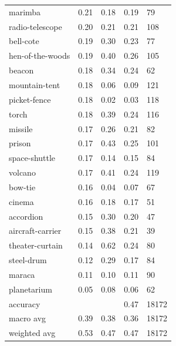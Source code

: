 \begin{center}
\begin{longtable}{lllll}
marimba & 0.21 & 0.18 & 0.19 & 79 \\
radio-telescope & 0.20 & 0.21 & 0.21 & 108 \\
bell-cote & 0.19 & 0.30 & 0.23 & 77 \\
hen-of-the-woods & 0.19 & 0.40 & 0.26 & 105 \\
beacon & 0.18 & 0.34 & 0.24 & 62 \\
mountain-tent & 0.18 & 0.06 & 0.09 & 121 \\
picket-fence & 0.18 & 0.02 & 0.03 & 118 \\
torch & 0.18 & 0.39 & 0.24 & 116 \\
missile & 0.17 & 0.26 & 0.21 & 82 \\
prison & 0.17 & 0.43 & 0.25 & 101 \\
space-shuttle & 0.17 & 0.14 & 0.15 & 84 \\
volcano & 0.17 & 0.41 & 0.24 & 119 \\
bow-tie & 0.16 & 0.04 & 0.07 & 67 \\
cinema & 0.16 & 0.18 & 0.17 & 51 \\
accordion & 0.15 & 0.30 & 0.20 & 47 \\
aircraft-carrier & 0.15 & 0.38 & 0.21 & 39 \\
theater-curtain & 0.14 & 0.62 & 0.24 & 80 \\
steel-drum & 0.12 & 0.29 & 0.17 & 84 \\
maraca & 0.11 & 0.10 & 0.11 & 90 \\
planetarium & 0.05 & 0.08 & 0.06 & 62 \\
\midrule
accuracy &  &  & 0.47 & 18172 \\
macro avg & 0.39 & 0.38 & 0.36 & 18172 \\
weighted avg & 0.53 & 0.47 & 0.47 & 18172 \\
\bottomrule
\end{longtable}
\end{center}
